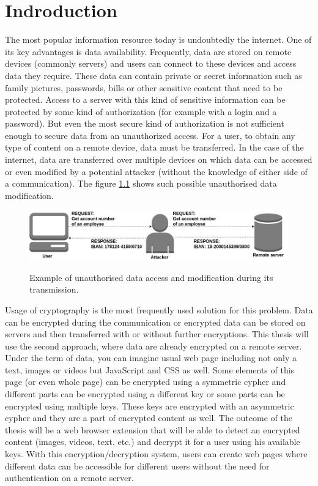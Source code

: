 \chapter{Indroduction}
The most popular information resource today is undoubtedly the internet. One of its key advantages is data availability. Frequently, data are stored on remote devices (commonly servers) and users can connect to these devices and access data they require. These data can contain private or secret information such as family pictures, passwords, bills or other sensitive content that need to be protected. Access to a server with this kind of sensitive information can be protected by some kind of authorization (for example with a login and a password). But even the most secure kind of authorization is not sufficient enough to secure data from an unauthorized access. For a user, to obtain any type of content on a remote device, data must be transferred. In the case of the internet, data are transferred over multiple devices on which data can be accessed or even modified by a potential attacker (without the knowledge of either side of a communication). The figure \ref{img:unsecureConnection} shows such possible unauthorised data modification.

\begin{figure}[H]
    \begin{center}
        \label{img:unsecureConnection}
        \includegraphics[width=1.0\textwidth]{obrazky-figures/unsecureconnection.png}
        \caption{Example of unauthorised data access and modification during its transmission.}
    \end{center}
\end{figure}

Usage of cryptography is the most frequently used solution for this problem. Data can be encrypted during the communication or encrypted data can be stored on servers and then transferred with or without further encryptions. This thesis will use the second approach, where data are already encrypted on a remote server. Under the term of data, you can imagine usual web page including not only a text, images or videos but JavaScript and CSS as well. Some elements of this page (or even whole page) can be encrypted using a symmetric cypher and different parts can be encrypted using a different key or some parts can be encrypted using multiple keys. These keys are encrypted with an asymmetric cypher and they are a part of encrypted content as well. The outcome of the thesis will be a web browser extension that will be able to detect an encrypted content (images, videos, text, etc.) and decrypt it for a user using his available keys. With this encryption/decryption system, users can create web pages where different data can be accessible for different users without the need for authentication on a remote server.

